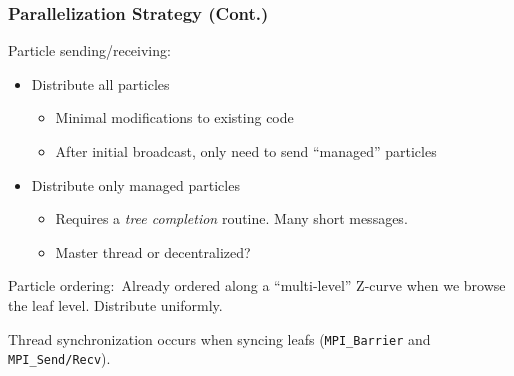 \begin{frame}
\frametitle{Parallelization Strategy (Cont.)}
Particle sending/receiving:
\begin{itemize}
	\item Distribute all particles
	\begin{itemize}
		\item Minimal modifications to existing code
		\item After initial broadcast, only need to send ``managed'' particles
	\end{itemize}
	\item Distribute only managed particles
	\begin{itemize}
		\item Requires a \emph{tree completion} routine. Many short messages.
		\item Master thread or decentralized?
	\end{itemize}
\end{itemize}
\par
Particle ordering:~Already ordered along a ``multi-level'' Z-curve when we browse the leaf level. Distribute uniformly.
\par
Thread synchronization occurs when syncing leafs (\lstinline|MPI_Barrier| and \lstinline|MPI_Send/Recv|). %
\end{frame}

